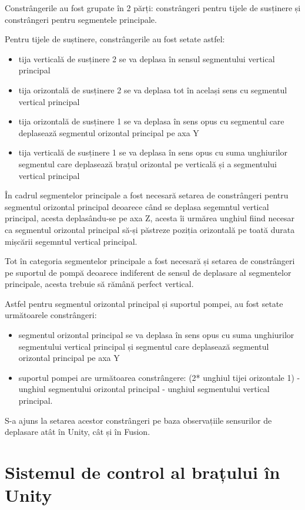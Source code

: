 Constrângerile au fost grupate în 2 părți: constrângeri pentru tijele de susținere și constrângeri pentru segmentele principale.

Pentru tijele de suștinere, constrângerile au fost setate astfel:
\begin{itemize}
	\item tija verticală de susținere 2 se va deplasa în sensul segmentului vertical principal
	\item tija orizontală de susținere 2 se va deplasa tot în același sens cu segmentul vertical principal
	\item tija orizontală de susținere 1 se va deplasa în sens opus cu segmentul care deplasează segmentul orizontal principal pe axa Y
	\item tija verticală de susținere 1 se va deplasa în sens opus cu suma unghiurilor segmentul care deplasează brațul orizontal pe verticală și a segmentului vertical principal
\end{itemize}

În cadrul segmentelor principale a fost necesară setarea de constrângeri pentru segmentul orizontal principal deoarece când se deplasa segemntul vertical principal, acesta deplasându-se pe axa Z, acesta îi urmărea unghiul fiind necesar ca  segmentul orizontal principal să-și păstreze poziția orizontală pe toată durata mișcării segemntul vertical principal. 

Tot în categoria segmentelor principale a fost necesară și setarea de constrângeri pe suportul de pompă deoarece indiferent de sensul de deplasare al segmentelor principale, acesta trebuie să rămână perfect vertical.

Astfel pentru segmentul orizontal principal și suportul pompei, au fost setate următoarele constrângeri:
\begin{itemize}
	\item segmentul orizontal principal se va deplasa în sens opus cu suma unghiurilor segmentului vertical principal și segmentul care deplasează  segmentul orizontal principal pe axa Y
	\item suportul pompei are următoarea constrângere: (2* unghiul tijei orizontale 1) - unghiul segmentului orizontal principal - unghiul segmentului vertical principal.
\end{itemize}

S-a ajuns la setarea acestor constrângeri pe baza observațiile sensurilor de deplasare atât în Unity, cât și în Fusion.

\section{Sistemul de control al brațului în Unity}
